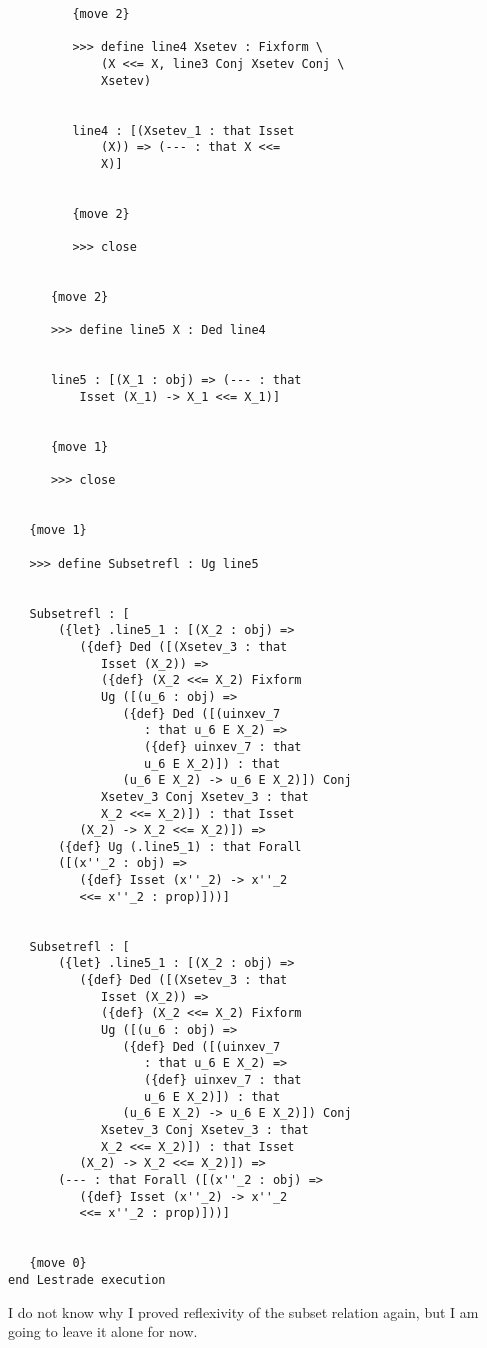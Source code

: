\documentclass[12pt]{article}
\begin{document}
\begin{verbatim}
         {move 2}

         >>> define line4 Xsetev : Fixform \
             (X <<= X, line3 Conj Xsetev Conj \
             Xsetev)


         line4 : [(Xsetev_1 : that Isset 
             (X)) => (--- : that X <<= 
             X)]


         {move 2}

         >>> close


      {move 2}

      >>> define line5 X : Ded line4


      line5 : [(X_1 : obj) => (--- : that 
          Isset (X_1) -> X_1 <<= X_1)]


      {move 1}

      >>> close


   {move 1}

   >>> define Subsetrefl : Ug line5


   Subsetrefl : [
       ({let} .line5_1 : [(X_2 : obj) => 
          ({def} Ded ([(Xsetev_3 : that 
             Isset (X_2)) => 
             ({def} (X_2 <<= X_2) Fixform 
             Ug ([(u_6 : obj) => 
                ({def} Ded ([(uinxev_7 
                   : that u_6 E X_2) => 
                   ({def} uinxev_7 : that 
                   u_6 E X_2)]) : that 
                (u_6 E X_2) -> u_6 E X_2)]) Conj 
             Xsetev_3 Conj Xsetev_3 : that 
             X_2 <<= X_2)]) : that Isset 
          (X_2) -> X_2 <<= X_2)]) => 
       ({def} Ug (.line5_1) : that Forall 
       ([(x''_2 : obj) => 
          ({def} Isset (x''_2) -> x''_2 
          <<= x''_2 : prop)]))]


   Subsetrefl : [
       ({let} .line5_1 : [(X_2 : obj) => 
          ({def} Ded ([(Xsetev_3 : that 
             Isset (X_2)) => 
             ({def} (X_2 <<= X_2) Fixform 
             Ug ([(u_6 : obj) => 
                ({def} Ded ([(uinxev_7 
                   : that u_6 E X_2) => 
                   ({def} uinxev_7 : that 
                   u_6 E X_2)]) : that 
                (u_6 E X_2) -> u_6 E X_2)]) Conj 
             Xsetev_3 Conj Xsetev_3 : that 
             X_2 <<= X_2)]) : that Isset 
          (X_2) -> X_2 <<= X_2)]) => 
       (--- : that Forall ([(x''_2 : obj) => 
          ({def} Isset (x''_2) -> x''_2 
          <<= x''_2 : prop)]))]


   {move 0}
end Lestrade execution
\end{verbatim}

I do not know why I proved reflexivity of the subset relation again, but I am going to leave it alone for now.
\end{document}
